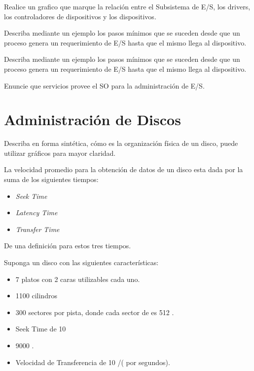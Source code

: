 \begin{questions}

\question Realice un grafico que marque la relación entre el Subsistema de E/S, los drivers, los controladores de dispositivos y los dispositivos.

\question Describa mediante un ejemplo los pasos mínimos que se suceden desde que un proceso genera un requerimiento de E/S hasta que el mismo llega al dispositivo.

\question Describa mediante un ejemplo los pasos mínimos que se suceden desde que un proceso genera un requerimiento de E/S hasta que el mismo llega al dispositivo.

\question Enuncie que servicios provee el SO para la administración de E/S.

\section{Administración de Discos}

\question Describa en forma sintética, cómo es la organización física de un disco, puede utilizar gráficos para mayor claridad.

\question La velocidad promedio para la obtención de datos de un disco esta dada por la suma de los siguientes tiempos:
\begin{itemize}
	\item \textit{Seek Time}
	\item \textit{Latency Time}
	\item \textit{Transfer Time}
\end{itemize}
De una definición para estos tres tiempos.

\question Suponga un disco con las siguientes características:
\begin{itemize}
	\item 7 platos con 2 caras utilizables cada uno.
	\item 1100 cilindros
	\item 300 sectores por pista, donde cada sector de es 512 \bytes.
	\item Seek Time de 10 \ms
	\item 9000 \rpm.
	\item Velocidad de Transferencia de 10 \mebishort\bytesshort/\s (\mebi\bytes \hspace{1pt} por segundos).
\end{itemize}
\begin{parts}

\end{parts}
\end{questions}
